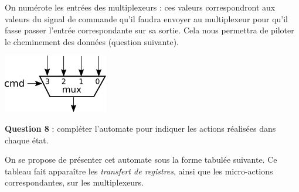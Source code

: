 \documentclass[a4paper,11pt]{exam}
\begin{document}
\begin{questions}
\begin{solution}
      On numérote les entrées des multiplexeurs : ces valeurs correspondront aux valeurs du signal de commande qu'il faudra envoyer au multiplexeur pour qu'il fasse passer l'entrée correspondante sur sa sortie. Cela nous permettra de piloter le cheminement des données (question suivante).
      \begin{center}
        \includegraphics[scale=0.6]{mux.png}
      \end{center}
    \end{solution}

  \question \textbf{Question 8} : compléter l'automate pour indiquer les actions réalisées dans chaque état.
  \begin{solution}
    On se propose de présenter cet automate sous la forme tabulée suivante. Ce tableau fait apparaître les \textit{transfert de registres}, ainsi que les micro-actions correspondantes, sur les multiplexeurs.


\end{solution}
\end{questions}
\end{document}
